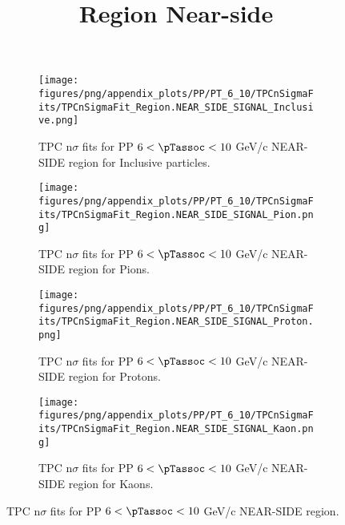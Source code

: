             \begin{figure}[H]
                \title{Region Near-side}
                \begin{subfigure}[b]{0.5\textwidth}
                    \centering
                    \texttt{[image: figures/png/appendix\_plots/PP/PT\_6\_10/TPCnSigmaFits/TPCnSigmaFit\_Region.NEAR\_SIDE\_SIGNAL\_Inclusive.png]}
                    \caption{TPC n$\sigma$ fits for PP $6 < \pTassoc < 10$ GeV/c NEAR-SIDE region for Inclusive particles.}
                    \label{fig:appendix_PP_$6 < \pTassoc < 10$ GeV/c_NEAR_SIDE_SIGNAL_Inclusive}
                \end{subfigure}
                \begin{subfigure}[b]{0.5\textwidth}
                    \centering
                    \texttt{[image: figures/png/appendix\_plots/PP/PT\_6\_10/TPCnSigmaFits/TPCnSigmaFit\_Region.NEAR\_SIDE\_SIGNAL\_Pion.png]}
                    \caption{TPC n$\sigma$ fits for PP $6 < \pTassoc < 10$ GeV/c NEAR-SIDE region for Pions.}
                    \label{fig:appendix_PP_$6 < \pTassoc < 10$ GeV/c_NEAR_SIDE_SIGNAL_Pion}
                \end{subfigure}
                \begin{subfigure}[b]{0.5\textwidth}
                    \centering
                    \texttt{[image: figures/png/appendix\_plots/PP/PT\_6\_10/TPCnSigmaFits/TPCnSigmaFit\_Region.NEAR\_SIDE\_SIGNAL\_Proton.png]}
                    \caption{TPC n$\sigma$ fits for PP $6 < \pTassoc < 10$ GeV/c NEAR-SIDE region for Protons.}
                    \label{fig:appendix_PP_$6 < \pTassoc < 10$ GeV/c_NEAR_SIDE_SIGNAL_Proton}
                \end{subfigure}
                \begin{subfigure}[b]{0.5\textwidth}
                    \centering
                    \texttt{[image: figures/png/appendix\_plots/PP/PT\_6\_10/TPCnSigmaFits/TPCnSigmaFit\_Region.NEAR\_SIDE\_SIGNAL\_Kaon.png]}
                    \caption{TPC n$\sigma$ fits for PP $6 < \pTassoc < 10$ GeV/c NEAR-SIDE region for Kaons.}
                    \label{fig:appendix_PP_$6 < \pTassoc < 10$ GeV/c_NEAR_SIDE_SIGNAL_Kaon}
                \end{subfigure}
                \caption{TPC n$\sigma$ fits for PP $6 < \pTassoc < 10$ GeV/c NEAR-SIDE region.}
                \label{fig:appendix_PP_$6 < \pTassoc < 10$ GeV/c_NEAR_SIDE_SIGNAL}
            \end{figure}
